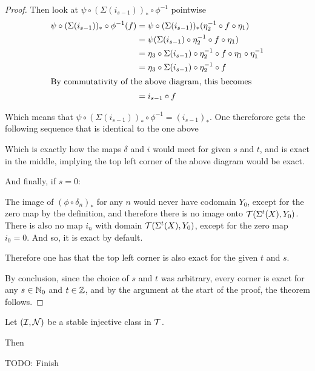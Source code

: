 \begin{proof}
    Then look at \( \psi \circ (\Sigma(i_{s-1}))_* \circ \phi^{-1} \) pointwise
    \begin{align*}
        \psi \circ (\Sigma(i_{s-1}))_* \circ \phi^{-1} ( f ) &= \psi \circ (\Sigma(i_{s-1}))_* ( \eta_2^{-1} \circ f \circ \eta_1 ) \\
        &= \psi ( \Sigma(i_{s - 1}) \circ \eta_2^{-1} \circ f \circ \eta_1 ) \\
        &= \eta_3 \circ \Sigma(i_{s - 1}) \circ \eta_2^{-1} \circ f \circ \eta_1 \circ \eta_1^{-1} \\
        &= \eta_3 \circ \Sigma(i_{s - 1}) \circ \eta_2^{-1} \circ f \\
        \intertext{By commutativity of the above diagram, this becomes}
        &= i_{s - 1} \circ f
    \end{align*}

    Which means that \( \psi \circ (\Sigma(i_{s-1}))_* \circ \phi^{-1} = ( i_{s - 1} )_* \). One thereforore gets the following sequence that is identical to the one above
    \begin{center}
    \end{center}
    Which is exactly how the maps \( \delta \) and \( i \) would meet for given \( s \) and \( t \), and is exact in the middle, implying the top left corner of the above diagram would be exact.

    And finally, if \( s = 0 \):

    The image of \( (\phi \circ \delta_n)_* \) for any \( n \) would never have codomain \( Y_0 \), except for the zero map by the definition, and therefore there is no image onto \( {\mathcal{T}}(\Sigma^t( X ), Y_0) \). There is also no map \( i_n \) with domain \( {\mathcal{T}}(\Sigma^t( X ), Y_0) \), except for the zero map \( i_0 = 0 \). And so, it is exact by default.

    Therefore one has that the top left corner is also exact for the given \( t \) and \( s \).

    By conclusion, since the choice of \( s \) and \( t \) was arbitrary, every corner is exact for any \( s \in {\mathbb{N}}_0 \) and \( t \in {\mathbb{Z}} \), and by the argument at the start of the proof, the theorem follows.
\end{proof}

\begin{definition}
    Let \( ({\mathcal{I}}, {\mathcal{N}}) \) be a stable injective class in \( {\mathcal{T}} \).

    Then

    TODO: Finish
\end{definition}
